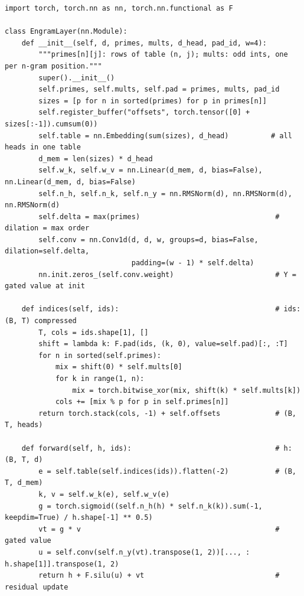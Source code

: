 \begin{lstlisting}[caption={Reference implementation (ours): hashed $N$-gram lookup with context-aware gated fusion (one branch).},label={lst:c10-engram-ref}]
import torch, torch.nn as nn, torch.nn.functional as F

class EngramLayer(nn.Module):
    def __init__(self, d, primes, mults, d_head, pad_id, w=4):
        """primes[n][j]: rows of table (n, j); mults: odd ints, one per n-gram position."""
        super().__init__()
        self.primes, self.mults, self.pad = primes, mults, pad_id
        sizes = [p for n in sorted(primes) for p in primes[n]]
        self.register_buffer("offsets", torch.tensor([0] + sizes[:-1]).cumsum(0))
        self.table = nn.Embedding(sum(sizes), d_head)          # all heads in one table
        d_mem = len(sizes) * d_head
        self.w_k, self.w_v = nn.Linear(d_mem, d, bias=False), nn.Linear(d_mem, d, bias=False)
        self.n_h, self.n_k, self.n_y = nn.RMSNorm(d), nn.RMSNorm(d), nn.RMSNorm(d)
        self.delta = max(primes)                                # dilation = max order
        self.conv = nn.Conv1d(d, d, w, groups=d, bias=False, dilation=self.delta,
                              padding=(w - 1) * self.delta)
        nn.init.zeros_(self.conv.weight)                        # Y = gated value at init

    def indices(self, ids):                                     # ids: (B, T) compressed
        T, cols = ids.shape[1], []
        shift = lambda k: F.pad(ids, (k, 0), value=self.pad)[:, :T]
        for n in sorted(self.primes):
            mix = shift(0) * self.mults[0]
            for k in range(1, n):
                mix = torch.bitwise_xor(mix, shift(k) * self.mults[k])
            cols += [mix % p for p in self.primes[n]]
        return torch.stack(cols, -1) + self.offsets             # (B, T, heads)

    def forward(self, h, ids):                                  # h: (B, T, d)
        e = self.table(self.indices(ids)).flatten(-2)           # (B, T, d_mem)
        k, v = self.w_k(e), self.w_v(e)
        g = torch.sigmoid((self.n_h(h) * self.n_k(k)).sum(-1, keepdim=True) / h.shape[-1] ** 0.5)
        vt = g * v                                              # gated value
        u = self.conv(self.n_y(vt).transpose(1, 2))[..., : h.shape[1]].transpose(1, 2)
        return h + F.silu(u) + vt                               # residual update
\end{lstlisting}

